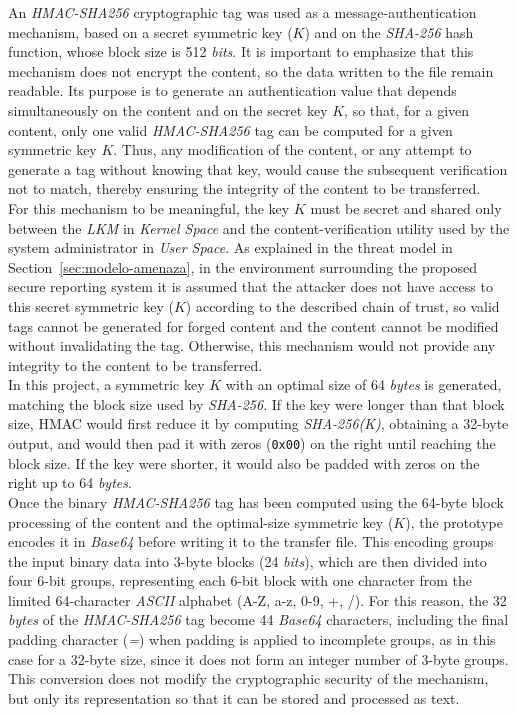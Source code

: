An \textit{HMAC-SHA256} cryptographic tag was used as a message-authentication mechanism, based on a secret symmetric key (\(K\)) and on the \textit{SHA-256} hash function, whose block size is 512 \textit{bits}.
It is important to emphasize that this mechanism does not encrypt the content, so the data written to the file remain readable.
Its purpose is to generate an authentication value that depends simultaneously on the content and on the secret key \(K\), so that, for a given content, only one valid \textit{HMAC-SHA256} tag can be computed for a given symmetric key \(K\).
Thus, any modification of the content, or any attempt to generate a tag without knowing that key, would cause the subsequent verification not to match, thereby ensuring the integrity of the content to be transferred.\\

For this mechanism to be meaningful, the key \(K\) must be secret and shared only between the \textit{LKM} in \textit{Kernel Space} and the content-verification utility used by the system administrator in \textit{User Space}.
As explained in the threat model in Section~\ref{sec:modelo-amenaza}, in the environment surrounding the proposed secure reporting system it is assumed that the attacker does not have access to this secret symmetric key (\(K\)) according to the described chain of trust, so valid tags cannot be generated for forged content and the content cannot be modified without invalidating the tag.
Otherwise, this mechanism would not provide any integrity to the content to be transferred.\\

In this project, a symmetric key \(K\) with an optimal size of 64 \textit{bytes} is generated, matching the block size used by \textit{SHA-256}.
If the key were longer than that block size, HMAC would first reduce it by computing \textit{SHA-256(K)}, obtaining a 32-byte output, and would then pad it with zeros (\texttt{0x00}) on the right until reaching the block size.
If the key were shorter, it would also be padded with zeros on the right up to 64 \textit{bytes}.\\

Once the binary \textit{HMAC-SHA256} tag has been computed using the 64-byte block processing of the content and the optimal-size symmetric key (\(K\)), the prototype encodes it in \textit{Base64} before writing it to the transfer file.
This encoding groups the input binary data into 3-byte blocks (24 \textit{bits}), which are then divided into four 6-bit groups, representing each 6-bit block with one character from the limited 64-character \textit{ASCII} alphabet (A-Z, a-z, 0-9, +, /).
For this reason, the 32 \textit{bytes} of the \textit{HMAC-SHA256} tag become 44 \textit{Base64} characters, including the final padding character (\textit{=}) when padding is applied to incomplete groups, as in this case for a 32-byte size, since it does not form an integer number of 3-byte groups.
This conversion does not modify the cryptographic security of the mechanism, but only its representation so that it can be stored and processed as text.\\

